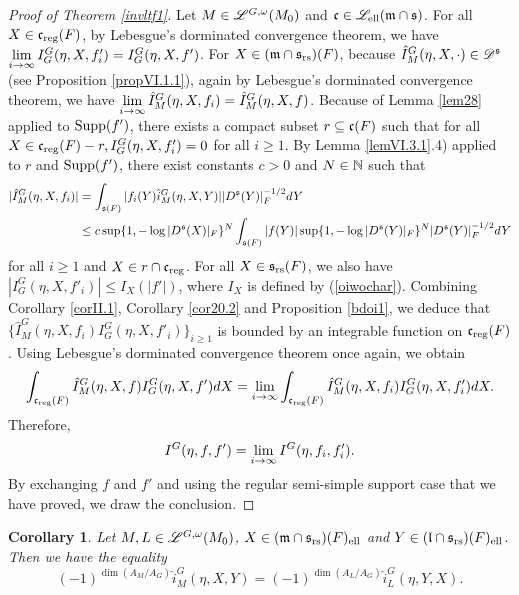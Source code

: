 \documentclass[a4paper]{amsart}
\newcommand{\fm}{{\mathfrak{m}}} \newcommand{\fn}{{\mathfrak{n}}}\newcommand{\fo}{{\mathfrak{o}}} \newcommand{\fp}{{\mathfrak{p}}}
\newtheorem{coro}[thm]{Corollary}
\theoremstyle{definition}
\theoremstyle{remark}
\numberwithin{equation}{subsection}
\begin{document}
\begin{proof}[Proof of Theorem \ref{invltf1}]
Let $M\in\mathscr{L}^{G,\omega}(M_0)$ and $\fc\in\msl_\el(\fm\cap\fs)$. For all $X\in{\mathfrak{c}}_{\mathrm{reg}}(F)$, by Lebesgue's dorminated convergence theorem, we have $\lim\limits_{i\rightarrow\infty} I_G^G(\eta, X, f'_i)=I_G^G(\eta, X, f')$. For $X\in(\fm\cap\fs_\rs)(F)$, because $\hat{I}_M^G(\eta, X, \cdot)\in\mathscr{D}^{\mathfrak{s}}$ (see Proposition \ref{propVI.1.1}), again by Lebesgue's dorminated convergence theorem, we have $\lim\limits_{i\rightarrow\infty} \hat{I}_M^G(\eta, X, f_i)=\hat{I}_M^G(\eta, X, f)$. Because of Lemma \ref{lem28} applied to ${\mathrm{Supp}}(f')$, there exists a compact subset $r\subseteq{\mathfrak{c}}(F)$ such that for all $X\in{\mathfrak{c}}_{\mathrm{reg}}(F)-r, I_G^G(\eta, X, f'_i)=0$ for all $i\geq1$. By Lemma \ref{lemVI.3.1}.4) applied to $r$ and ${\mathrm{Supp}}(f')$, there exist constants $c>0$ and $N\in{\mathbb {N}}$ such that
\[\begin{split}
 |\hat{I}_M^G(\eta, X, f_i)|&= \int_{{\mathfrak{s}}(F)} |f_i(Y) \hat{i}_M^G(\eta, X, Y)| |D^{\mathfrak{s}}(Y)|_F^{-1/2} dY \\
&\leq c\sup\{1, -\log|D^{\mathfrak{s}}(X)|_F\}^N \int_{{\mathfrak{s}}(F)} |f(Y)| \sup\{1, -\log|D^{\mathfrak{s}}(Y)|_F\}^N |D^{\mathfrak{s}}(Y)|_F^{-1/2} dY 
\end{split}\]
for all $i\geq1$ and $X\in r\cap{\mathfrak{c}}_{\mathrm{reg}}$. For all $X\in{\mathfrak{s}}_{\mathrm{rs}}(F)$, we also have $|I_G^G(\eta, X, f'_i)|\leq I_X(|f'|)$, where $I_X$ is defined by (\ref{oiwochar}). Combining Corollary \ref{corII.1}, Corollary \ref{cor20.2} and Proposition \ref{bdoi1}, we deduce that $\{\hat{I}_M^G(\eta, X, f_i) I_G^G(\eta, X, f'_i)\}_{i\geq1}$ is bounded by an integrable function on ${\mathfrak{c}}_{\mathrm{reg}}(F)$. Using Lebesgue's dorminated convergence theorem once again, we obtain
$$ \int_{{\mathfrak{c}}_{\mathrm{reg}}(F)} \hat{I}_M^G(\eta, X, f) I_G^G(\eta, X, f') dX=\lim_{i\rightarrow\infty} \int_{{\mathfrak{c}}_{\mathrm{reg}}(F)} \hat{I}_M^G(\eta, X, f_i) I_G^G(\eta, X, f'_i) dX. $$
Therefore, 
$$ I^G(\eta, f, f')=\lim_{i\rightarrow\infty} I^G(\eta, f_i, f'_i). $$
By exchanging $f$ and $f'$ and using the regular semi-simple support case that we have proved, we draw the conclusion. 
\end{proof}

\begin{coro}\label{corinvltf1}
Let $M, L\in\mathscr{L}^{G, \omega}(M_0)$, $X\in(\fm\cap\fs_\rs)(F)_\el$ and $Y\in({\mathfrak{l}}\cap{\mathfrak{s}}_{\mathrm{rs}})(F)_{\mathrm{ell}}$. Then we have the equality
$$ (-1)^{\dim(A_M/A_G)} \hat{i}_M^G(\eta, X, Y)=(-1)^{\dim(A_L/A_G)} \hat{i}_L^G(\eta, Y, X). $$
\end{coro}
\end{document}
